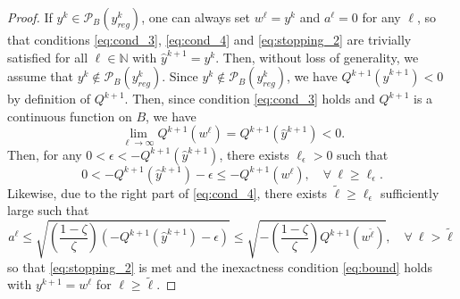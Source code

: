 \documentclass[10pt,a4paper]{amsart}
\def\N{\mathbb{N}}
\newcommand{\yck}{{y_{reg}^k}}
\begin{document}
\begin{proof}
If $y^k \in  \mathcal{P}_{B}(\yck)$,  one can always set $w^{\ell} = y^k$ and   $a^{\ell}=0$ for any $\ell$, so that conditions \eqref{eq:cond_3}, \eqref{eq:cond_4} and \eqref{eq:stopping_2} are trivially satisfied for all $\ell\in\N$ with $\hat{y}^{k+1}=y^k $. Then, without loss of generality, we assume that $y^k\notin \mathcal{P}_{B}(\yck)$.
Since $y^k \notin \mathcal{P}_B(\yck)$, we have $Q^{k+1}(\hat{y}^{k+1})<0$ by definition of $Q^{k+1}$. Then, since condition \eqref{eq:cond_3} holds and $Q^{k+1}$ is a continuous function on $B$, we have 
\begin{equation*}
    \lim_{\ell\rightarrow \infty}Q^{k+1}(w^{\ell})=Q^{k+1}(\hat{y}^{k+1})<0.
\end{equation*}
Then, for any $0<\epsilon<-Q^{k+1}(\hat{y}^{k+1})$, there exists $\ell_\epsilon>0$ such that
\begin{equation*}
    0<-Q^{k+1}(\hat{y}^{k+1})-\epsilon\leq -Q^{k+1}(w^\ell), \quad \forall \ \ell\geq \ell_{\epsilon}. 
\end{equation*}
Likewise, due to the right part of \eqref{eq:cond_4}, there exists $\tilde{\ell}\ge \ell_\epsilon$ sufficiently large such that
\begin{equation*}
    a^{{\ell}}\leq \sqrt{\left(\frac{1-\zeta}{\zeta}\right)(-Q^{k+1}(\hat{y}^{k+1})-\epsilon)}\leq\sqrt{-\left(\frac{1-\zeta}{\zeta}\right)Q^{k+1}(w^{\tilde{\ell}})}, \quad \forall \ \ell>\tilde \ell
\end{equation*}
so that \eqref{eq:stopping_2} is met and the inexactness condition \eqref{eq:bound} holds with $y^{k+1} = w^{{\ell}}$ for $\ell\ge \tilde \ell$.
\end{proof}
\end{document}
